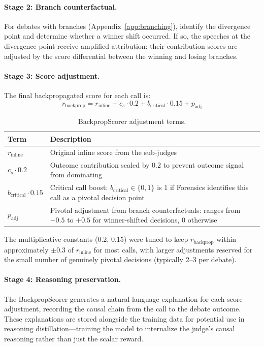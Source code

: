 \paragraph{Stage 2: Branch counterfactual.}
For debates with branches (Appendix~\ref{app:branching}), identify the
divergence point and determine whether a winner shift occurred. If so,
the speeches at the divergence point receive amplified attribution:
their contribution scores are adjusted by the score differential between
the winning and losing branches.

\paragraph{Stage 3: Score adjustment.}
The final backpropagated score for each call is:
\begin{equation}
r_{\text{backprop}} = r_{\text{inline}} + c_s \cdot 0.2 + b_{\text{critical}} \cdot 0.15 + p_{\text{adj}}
\label{eq:backprop}
\end{equation}

\begin{table}[h]
\centering
\small
\begin{tabular}{lp{8cm}}
\toprule
\textbf{Term} & \textbf{Description} \\
\midrule
$r_{\text{inline}}$ & Original inline score from the sub-judges \\
$c_s \cdot 0.2$ & Outcome contribution scaled by 0.2 to prevent outcome signal from dominating \\
$b_{\text{critical}} \cdot 0.15$ & Critical call boost: $b_{\text{critical}} \in \{0, 1\}$ is 1 if Forensics identifies this call as a pivotal decision point \\
$p_{\text{adj}}$ & Pivotal adjustment from branch counterfactuals: ranges from $-0.5$ to $+0.5$ for winner-shifted decisions, 0 otherwise \\
\bottomrule
\end{tabular}
\caption{BackpropScorer adjustment terms.}
\label{tab:backprop_terms}
\end{table}

The multiplicative constants (0.2, 0.15) were tuned to keep
$r_{\text{backprop}}$ within approximately $\pm 0.3$ of
$r_{\text{inline}}$ for most calls, with larger adjustments reserved
for the small number of genuinely pivotal decisions (typically 2--3
per debate).

\paragraph{Stage 4: Reasoning preservation.}
The BackpropScorer generates a natural-language explanation for each
score adjustment, recording the causal chain from the call to the
debate outcome. These explanations are stored alongside the training
data for potential use in reasoning distillation---training the model
to internalize the judge's causal reasoning rather than just the
scalar reward.

